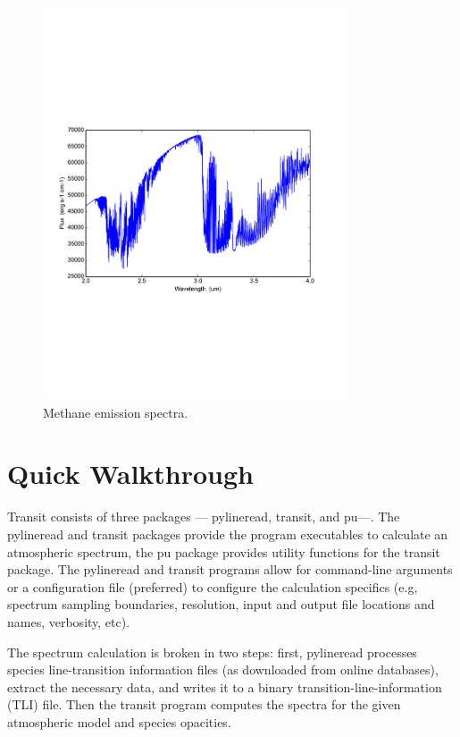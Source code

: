 \documentclass[letterpaper, 12pt]{article}
\begin{document}
\begin{figure}[htb]
\centerline{
\includegraphics[width=0.8\textwidth, clip]{figs/Methane_emission_spectra.pdf}}
\caption{\small Methane emission spectra.}
\label{fig:demo}
\end{figure}

\section{Quick Walkthrough}
\label{sec:walkthrough}

Transit consists of three packages --- pylineread, transit, and pu---.
The pylineread and transit packages provide the program executables to
calculate an atmospheric spectrum, the pu package provides utility
functions for the transit package.  The pylineread and transit
programs allow for command-line arguments or a configuration file
(preferred) to configure the calculation specifics (e.g, spectrum
sampling boundaries, resolution, input and output file locations and
names, verbosity, etc).

The spectrum calculation is broken in two steps: first, pylineread
processes species line-transition information files (as downloaded
from online databases), extract the necessary data, and writes it to a
binary transition-line-information (TLI) file.  Then the transit
program computes the spectra for the given atmospheric model and
species opacities.
\end{document}
